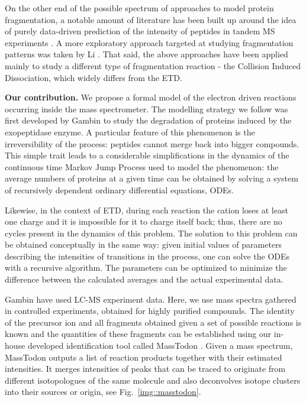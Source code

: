 \documentclass{llncs}
\begin{document}
        On the other end of the possible spectrum of approaches to model protein fragmentation, a notable amount of literature has been built up around the idea of purely data-driven prediction of the intensity of peptides in tandem MS experiments \cite{Elias2004-fr,Arnold2006-wn,Degroeve2013-ej} . A more exploratory approach targeted at studying fragmentation patterns was taken by Li \cite{Li2011-mq}. That said, the above approaches have been applied mainly to study a different type of fragmentation reaction - the Collision Induced Dissociation, which widely differs from the ETD.

\textbf{Our contribution.}
        We propose a formal model of the electron driven reactions occurring inside the mass spectrometer. The modelling strategy we follow was first developed by Gambin \cite{Gambin2010-mp} to study the degradation of proteins induced by the exopeptidase enzyme. A particular feature of this phenomenon is the irreversibility of the process: peptides cannot merge back into bigger compounds. This simple trait leads to a considerable simplifications in the dynamics of the continuous time Markov Jump Process used to model the phenomenon: the average numbers of proteins at a given time can be obtained by solving a system of recursively dependent ordinary differential equations, ODEs.

        Likewise, in the context of ETD, during each reaction the cation loses at least one charge and it is impossible for it to charge itself back; thus, there are no cycles present in the dynamics of this problem. The solution to this problem can be obtained conceptually in the same way: given initial values of parameters describing the intensities of transitions in the process, one can solve the ODEs with a recursive algorithm. The parameters can be optimized to minimize the difference between the calculated averages and the actual experimental data.

        Gambin \cite{Gambin2010-mp} have used LC-MS experiment data. Here, we use mass spectra gathered in controlled experiments, obtained for highly purified compounds. The identity of the precursor ion and all fragments obtained given a set of possible reactions is known and the quantities of these fragments can be established using our in-house developed identification tool called MassTodon \cite{Lermyte2015-iv,Lermyte2017-zt}. Given a mass spectrum, MassTodon outputs a list of reaction products together with their estimated intensities. It merges intensities of peaks that can be traced to originate from different isotopologues of the same molecule and also deconvolves isotope clusters into their sources or origin, see Fig.~\ref{img::masstodon}.
\end{document}
